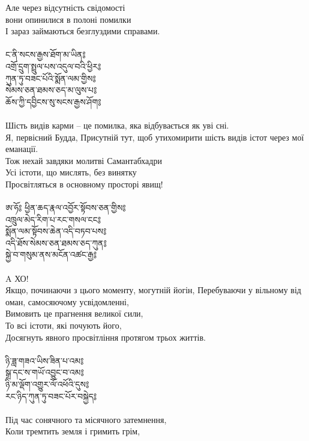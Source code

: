 Але через відсутність свідомості \\
вони опинилися в полоні помилки \\
І зараз займаються безглуздими справами. \\
\\
{\ti
ང་ནི་སངས་རྒྱས་ཐོག་མ་ཡིན༔ \\
འགྲོ་དྲུག་སྤྲུལ་པས་འདུལ་བའི་ཕྱིར༔ \\
ཀུན་ཏུ་བཟང་པོའི་སྨོན་ལམ་གྱིས༔ \\
སེམས་ཅན་ཐམས་ཅད་མ་ལུས་པ༔ \\
ཆོས་ཀྱི་དབྱིངས་སུ་སངས་རྒྱས་ཤོག༔}\\
\\
Шість видів карми – це помилка, яка відбувається як уві сні. \\
Я, первісний Будда, Присутній тут, щоб утихомирити шість видів істот через мої еманації. \\
Тож нехай завдяки молитві Самантабхадри \\
Усі істоти, що мислять, без винятку \\
Просвітляться в основному просторі явищ! \\
\\
\newpage
{\ti
ཨ་ཧོ༔ ཕྱིན་ཆད་རྣལ་འབྱོར་སྟོབས་ཅན་གྱིས༔ \\
འཁྲུལ་མེད་རིག་པ་རང་གསལ་ངང༔ \\
སྨོན་ལམ་སྟོབས་ཆེན་འདི་བཏབ་པས༔ \\
འདི་ཐོས་སེམས་ཅན་ཐམས་ཅད་ཀུན༔ \\
སྐྱེ་བ་གསུམ་ནས་མངོན་འཚང་རྒྱ༔}\\
\\
A ХО! \\
Якщо, починаючи з цього моменту, могутній йогін,
Перебуваючи у вільному від оман, самосяючому усвідомленні, \\
Вимовить це прагнення великої сили, \\
То всі істоти, які почують його, \\
Досягнуть явного просвітління протягом трьох життів. \\
\\
{\ti
ཉི་ཟླ་གཟའ་ཡིས་ཟིན་པ་འམ༔ \\
སྒྲ་དང་ས་གཡོ་འབྱུང་བ་འམ༔ \\
ཉི་མ་ལྡོག་འགྱུར་ལོ་འཕོའི་དུས༔ \\
རང་ཉིད་ཀུན་ཏུ་བཟང་པོར་བསྐྱེད༔}\\
\\
Під час сонячного та місячного затемнення, \\
Коли тремтить земля і гримить грім, \\
